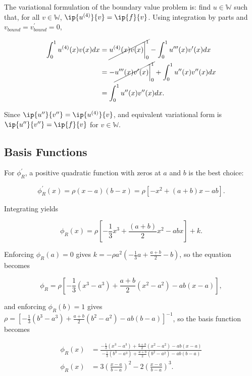 \documentclass{hw-template}
\newcommand{\W}{\mathbb{W}}
\begin{document}
The variational formulation of the boundary value problem is: find $u \in \W$ such that, for all $v \in \W$, $\ip{u^{(4)}}{v} = \ip{f}{v}$. Using integration by parts and $v_{bound} = v^\prime_{bound} = 0$, 

\begin{align}
    \int_{0}^{1} u^{(4)}(x) v(x) dx &= \cancel{u^{(4)}(x) v(x)\bigg\vert_{0}^1 } - \int_{0}^{1} u^{\prime\prime\prime}(x) v^\prime(x) dx \\
    &= - \cancel{u^{\prime\prime\prime}(x) v^\prime(x)\bigg\vert_{0}^1 }   +\int_{0}^{1} u^{\prime\prime}(x) v^{\prime\prime}(x) dx\\
    &= \int_{0}^{1} u^{\prime\prime}(x) v^{\prime\prime}(x) dx.
\end{align}

Since $\ip{u^{\prime\prime}}{v^{\prime\prime}} = \ip{u^{(4)}}{v}$, and equivalent variational form is $\ip{u^{\prime\prime}}{v^{\prime\prime}} = \ip{f}{v}$ for $v \in \W$.

\subsection{Basis Functions}  

For $\phi_R^\prime$, a positive quadratic function with zeros at $a$ and $b$ is the best choice:

\begin{equation}
    \phi_R^\prime(x) = \rho(x-a)(b-x) = \rho \left[ -x^2 + (a+b)x - ab \right].
\end{equation}

Integrating yields 

\begin{equation}
    \phi_R(x) = \rho \left[ -\frac{1}{3}x^3 + \frac{(a+b)}{2}x^2 - abx \right] + k.
\end{equation}

Enforcing $\phi_R(a) = 0$ gives $k = -\rho a^2 (-\frac{1}{3}a + \frac{a+b}{2} -b)$, so the equation becomes 

\begin{equation}
    \phi_R = \rho\left[ -\frac{1}{3}(x^3 - a^3) + \frac{a+b}{2}(x^2 - a^2) - ab(x-a) \right],
\end{equation}

and enforcing $\phi_R(b) = 1$ gives $\rho = \left[ -\frac{1}{3}(b^3 - a^3) + \frac{a+b}{2}(b^2 - a^2) - ab(b-a) \right]^{-1}$, so the basis function becomes

\begin{align}
  \phi_R(x) & =    \frac{ -\frac{1}{3}(x^3 - a^3) + \frac{a+b}{2}(x^2 - a^2) - ab(x-a) }{-\frac{1}{3}(b^3 - a^3) + \frac{a+b}{2}(b^2 - a^2) - ab(b-a) }\\
  \phi_R(x) & =   3\left( \frac{x-a}{b-a} \right)^2 - 2 \left( \frac{x-a}{b-a}\right)^3.
\end{align}
\end{document}
